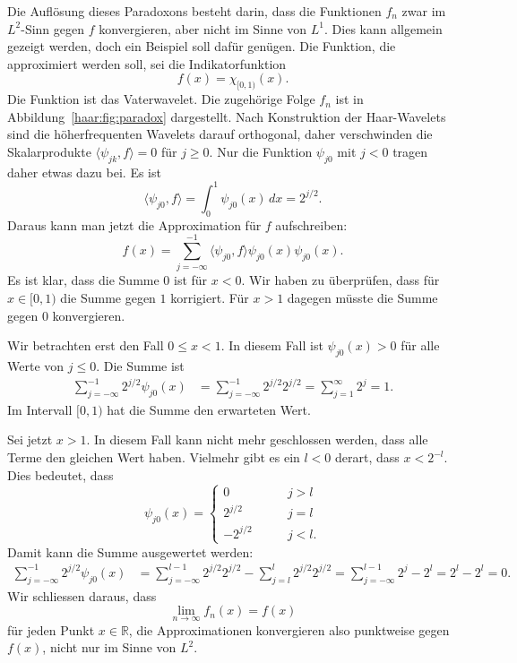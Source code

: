 Die Auflösung dieses Paradoxons besteht darin, dass die Funktionen
$f_n$ zwar im $L^2$-Sinn gegen $f$ konvergieren, aber nicht im Sinne von $L^1$.
Dies kann allgemein gezeigt werden, doch ein Beispiel soll dafür genügen.
Die Funktion, die approximiert werden soll, sei die Indikatorfunktion
\[
f(x) = \chi_{[0,1)}(x).
\]
Die Funktion ist das Vaterwavelet.
Die zugehörige Folge $f_n$ ist in Abbildung~\ref{haar:fig:paradox}
dargestellt.
Nach Konstruktion der Haar-Wavelets sind die höherfrequenten Wavelets
darauf orthogonal, daher verschwinden die Skalarprodukte
$\langle \psi_{jk},f\rangle=0$ für $j\ge 0$.
Nur die Funktion $\psi_{j0}$ mit $j<0$ tragen daher etwas dazu bei.
Es ist
\[
\langle \psi_{j0},f\rangle
=
\int_0^1 \psi_{j0}(x)\,dx
=
2^{j/2}.
\]
Daraus kann man jetzt die Approximation für $f$ aufschreiben:
\[
f(x)
=
\sum_{j=-\infty}^{-1} \langle \psi_{j0},f\rangle \psi_{j0}(x)
\psi_{j0}(x).
\]
Es ist klar, dass die Summe $0$ ist für $x<0$.
Wir haben zu überprüfen, dass für $x\in[0,1)$ die Summe gegen $1$ 
korrigiert. 
Für $x>1$ dagegen müsste die Summe gegen $0$ konvergieren.

Wir betrachten erst den Fall $0\le x < 1$.
In diesem Fall ist $\psi_{j0}(x)>0$ für alle Werte von $j\le 0$.
Die Summe ist
\begin{align*}
\sum_{j=-\infty}^{-1} 2^{j/2} \psi_{j0}(x)
&=
\sum_{j=-\infty}^{-1} 2^{j/2} 2^{j/2}
=
\sum_{j=1}^\infty 2^j = 1.
\end{align*}
Im Intervall $[0,1)$ hat die Summe den erwarteten Wert.

Sei jetzt $x>1$.
In diesem Fall kann nicht mehr geschlossen werden, dass alle Terme den
gleichen Wert haben.
Vielmehr gibt es ein $l<0$ derart, dass $x < 2^{-l}$.
Dies bedeutet, dass
\[
\psi_{j0}(x)
=
\begin{cases}
0&\qquad j>l\\
2^{j/2}&\qquad j = l
\\
-2^{j/2}&\qquad j < l.
\end{cases}
\]
Damit kann die Summe ausgewertet werden:
\begin{align*}
\sum_{j=-\infty}^{-1} 2^{j/2} \psi_{j0}(x)
&=
\sum_{j=-\infty}^{l-1} 2^{j/2} 2^{j/2}
-
\sum_{j=l}^{l} 2^{j/2} 2^{j/2}
=
\sum_{j=-\infty}^{l-1} 2^j
-
2^l
=
2^l
-
2^l
=
0.
\end{align*}
Wir schliessen daraus, dass 
\[
\lim_{n\to\infty} f_n(x) = f(x)
\]
für jeden Punkt $x\in\mathbb R$, die Approximationen konvergieren also
punktweise gegen $f(x)$, nicht nur im Sinne von $L^2$.

